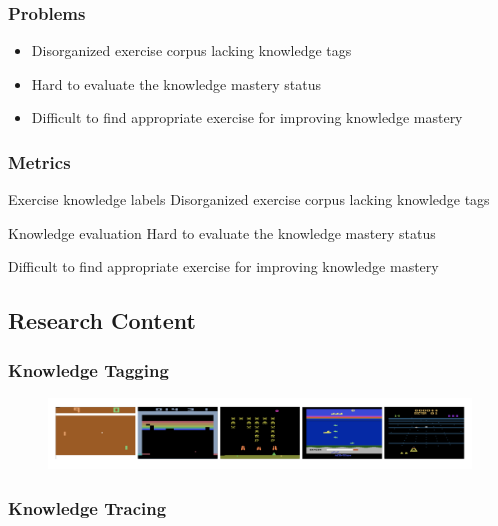 \documentclass{beamer}
\begin{document}
\begin{frame}
  \frametitle{Problems}
  \begin{itemize}
    \item Disorganized exercise corpus lacking knowledge tags
    \item Hard to evaluate the knowledge mastery status
    \item Difficult to find appropriate exercise for improving knowledge mastery
  \end{itemize}
\end{frame}
\begin{frame}
  \frametitle{Metrics}
  \begin{block}{Exercise knowledge labels}
    Disorganized exercise corpus lacking knowledge tags
  \end{block}
  \begin{block}{Knowledge evaluation}
    Hard to evaluate the knowledge mastery status
  \end{block}
  \begin{block}{}
    Difficult to find appropriate exercise for improving knowledge mastery
  \end{block}
\end{frame}
\subsection{Research Content}
\begin{frame}
  \frametitle{Knowledge Tagging}
  \begin{figure}
    \includegraphics[width=1.0\textwidth]{figures/atari.png}
  \end{figure}
\end{frame}


\begin{frame}
  \frametitle{Knowledge Tracing}

\end{frame}

\end{document}
